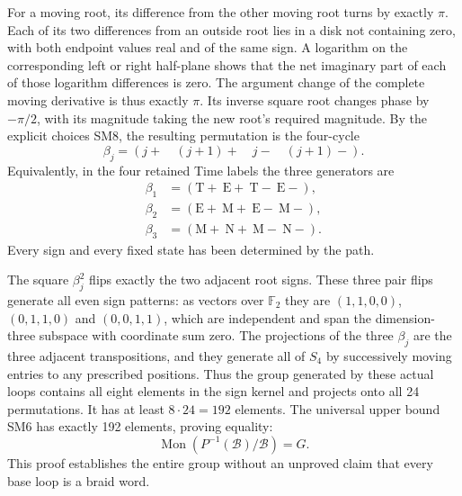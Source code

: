 \documentclass[11pt]{article}
\begin{document}
For a moving root, its difference from the other moving root turns
by exactly $\pi$. Each of its two differences from an outside
root lies in a disk not containing zero, with both endpoint values
real and of the same sign. A logarithm on the corresponding left
or right half-plane shows that the net imaginary part of each of
those logarithm differences is zero. The argument change of the
complete moving derivative is thus exactly $\pi$. Its inverse
square root changes phase by $-\pi/2$, with its magnitude taking
the new root's required magnitude. By the explicit choices SM8,
the resulting permutation is the four-cycle
\begin{equation}
 \beta_j=(j+\quad(j+1)+\quad j-\quad(j+1)-).
 \tag{SM10}
\end{equation}
Equivalently, in the four retained Time labels the three generators
are
\begin{equation}
 \begin{split}
 \beta_1&=(\mathrm T+\ \mathrm E+\ \mathrm T-\ \mathrm E-),\\
 \beta_2&=(\mathrm E+\ \mathrm M+\ \mathrm E-\ \mathrm M-),\\
 \beta_3&=(\mathrm M+\ \mathrm N+\ \mathrm M-\ \mathrm N-).
 \end{split}\tag{SM11}
\end{equation}
Every sign and every fixed state has been determined by the path.

The square $\beta_j^2$ flips exactly the two adjacent root signs.
These three pair flips generate all even sign patterns: as vectors
over $\mathbb F_2$ they are
$(1,1,0,0)$, $(0,1,1,0)$ and $(0,0,1,1)$, which are independent
and span the dimension-three subspace with coordinate sum zero.
The projections of the three $\beta_j$ are the three adjacent
transpositions, and they generate all of $S_4$ by successively
moving entries to any prescribed positions. Thus the group
generated by these actual loops contains all eight elements in
the sign kernel and projects onto all 24 permutations. It has
at least $8\cdot24=192$ elements. The universal upper bound SM6
has exactly 192 elements, proving equality:
\begin{equation}
 \boxed{\operatorname{Mon}(P^{-1}(\mathcal B)/\mathcal B)=G.}
 \tag{SM12}
\end{equation}
This proof establishes the entire group without an unproved claim
that every base loop is a braid word.
\end{document}
